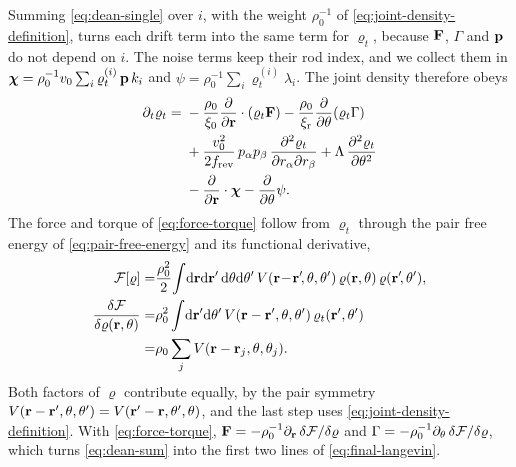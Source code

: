 \documentclass[aps,pre,reprint,superscriptaddress,longbibliography,nofootinbib
]{revtex4-2}
\begin{document}
Summing \cref{eq:dean-single} over $i$, with the weight
$\rho_0^{-1}$ of \cref{eq:joint-density-definition}, turns
each drift term into the same term for $\varrho_t$, because
$\mathbf{F}$, $\Gamma$ and $\mathbf{p}$ do not depend on $i$. The noise
terms keep their rod index, and we collect them in
$\boldsymbol\chi=\rho_0^{-1}v_0\sum_i\varrho^{(i)}_t\,\mathbf{p}\,k_i$ and
$\psi=\rho_0^{-1}\sum_i\varrho^{(i)}_t\lambda_i$. The joint
density therefore obeys
\begin{align}
  \label{eq:dean-sum}
  \partial_t\varrho_t = {}& -\frac{\rho_0}{\xi_0}\frac{\partial }{\partial \mathbf{r}}\cdot(\varrho_t\mathbf{F})
  - \frac{\rho_0}{\xi_{\rm r}}\frac{\partial }{\partial \theta}(\varrho_t\Gamma)
  \nonumber\\
  &+ \frac{v_0^2}{2f_{\rm rev}}\,p_\alpha p_\beta\,\frac{\partial ^2\varrho_t}{\partial r_\alpha\partial r_\beta}
  + \Lambda\,\frac{\partial ^2\varrho_t}{\partial \theta^2}
  \nonumber\\
  &- \frac{\partial }{\partial \mathbf{r}}\cdot\boldsymbol\chi - \frac{\partial }{\partial \theta}\psi .
\end{align}
The force and torque of \cref{eq:force-torque} follow from
$\varrho_t$ through the pair free energy of
\cref{eq:pair-free-energy} and its functional derivative,
\begin{align}
  \mathcal{F}[\varrho] =& \frac{\rho_0^2}2\!\int\!\mathrm{d}\mathbf{r}\mathrm{d}\mathbf{r}'\,\mathrm{d}\theta\mathrm{d}\theta'\,
  V(\mathbf{r}\!-\!\mathbf{r}'\!,\theta,\theta')\,\varrho(\mathbf{r},\theta)\,\varrho(\mathbf{r}'\!,\theta'),
  \nonumber
  \\
  \frac{\delta\mathcal{F}}{\delta\varrho(\mathbf{r},\theta)}=&\rho_0^2\int\!\mathrm{d}\mathbf{r}'\mathrm{d}\theta'\,
V(\mathbf{r}-\mathbf{r}',\theta,\theta')\,\varrho_t(\mathbf{r}',\theta')
\nonumber\\
=& \rho_0\sum_jV(\mathbf{r}-\mathbf{r}_j,\theta,\theta_j).
\label{eq:dean-functional-derivative}
\end{align}
Both factors of $\varrho$ contribute equally, by the pair
symmetry
$V(\mathbf{r}-\mathbf{r}',\theta,\theta')=V(\mathbf{r}'-\mathbf{r},\theta',\theta)$, and
the last step uses \cref{eq:joint-density-definition}. With
\cref{eq:force-torque},
$\mathbf{F}=-\rho_0^{-1}\partial_{\mathbf{r}}\,\delta\mathcal{F}/\delta\varrho$ and
$\Gamma
=-\rho_0^{-1}\partial_\theta\,\delta\mathcal{F}/\delta\varrho$,
which turns \cref{eq:dean-sum} into the first two lines of
\cref{eq:final-langevin}.
\end{document}
